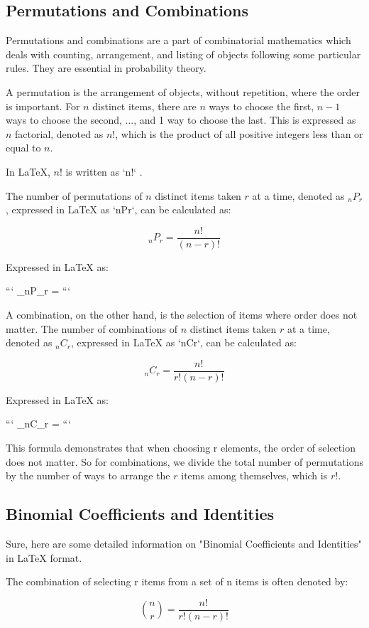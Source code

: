 \subsection{Permutations and Combinations}
Permutations and combinations are a part of combinatorial mathematics which deals with counting, arrangement, and listing of objects following some particular rules. They are essential in probability theory.

A permutation is the arrangement of objects, without repetition, where the order is important. For $n$ distinct items, there are $n$ ways to choose the first, $n-1$ ways to choose the second, ..., and 1 way to choose the last. This is expressed as $n$ factorial, denoted as $n!$, which is the product of all positive integers less than or equal to $n$. 

In LaTeX, $n!$ is written as `n!` .

The number of permutations of $n$ distinct items taken $r$ at a time, denoted as $_nP_r$, expressed in LaTeX as `nPr`, can be calculated as:

\[
_nP_r = \frac{n!}{(n-r)!}
\]

Expressed in LaTeX as:

```
\_nP\_r = 
```

A combination, on the other hand, is the selection of items where order does not matter. The number of combinations of $n$ distinct items taken $r$ at a time, denoted as $_nC_r$, expressed in LaTeX as `nCr`, can be calculated as:

\[
_nC_r = \frac{n!}{r!(n-r)!}
\]

Expressed in LaTeX as:

```
\_nC\_r = 
```

This formula demonstrates that when choosing r elements, the order of selection does not matter. So for combinations, we divide the total number of permutations by the number of ways to arrange the $r$ items among themselves, which is $r!$.

\subsection{Binomial Coefficients and Identities}
Sure, here are some detailed information on "Binomial Coefficients and Identities" in LaTeX format. 

The combination of selecting r items from a set of n items is often denoted by:

\[
{n \choose r} = \frac{n!}{r!(n - r)!}
\]

